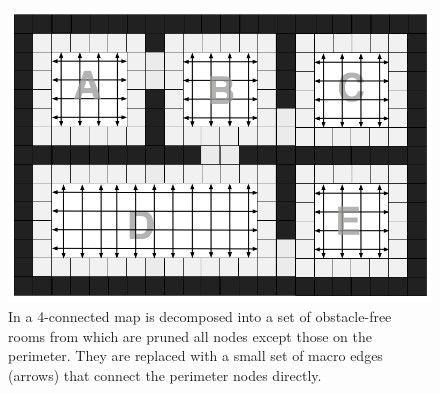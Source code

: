 

\begin{figure}[tb]
       \begin{center}
                       \includegraphics[scale=0.30, trim = 10mm 10mm 10mm 0mm]{diagrams/overview.png}
       \end{center}
	\vspace{-3pt}
       \caption{In \cite{harabor10} a 4-connected map is decomposed into a set of obstacle-free rooms from which are pruned all nodes except those on the perimeter.
				They are replaced with a small set of macro edges (arrows) that connect the perimeter nodes directly.}
       \label{fig-overview}
\end{figure}

